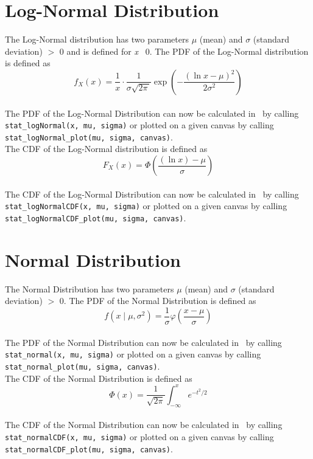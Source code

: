 	\section{Log-Normal Distribution}
	
		The Log-Normal distribution has two parameters $\mu$ (mean) and $\sigma$ (standard deviation) $>$ 0 and is defined for \textit{x} \geq\ 0. The \ac{PDF} of the Log-Normal distribution is defined as
		\\[0.3cm]
		$$f_X(x) = \frac 1 x \cdot \frac 1 {\sigma\sqrt{2\pi\,}} \exp\left( -\frac{(\ln x-\mu)^2}{2\sigma^2} \right)$$
		\\[0.3cm]
		The \ac{PDF} of the Log-Normal Distribution can now be calculated in \setlx\ by calling \lstinline{stat_logNormal(x, mu, sigma)} or plotted on a given canvas by calling \lstinline{stat_logNormal_plot(mu, sigma, canvas)}.
		\\[0.3cm]
		The \ac{CDF} of the Log-Normal distribution is defined as
		\\[0.3cm]
		$$F_X(x) = \Phi\left( \frac{(\ln x) - \mu} \sigma \right)$$
		\\[0.3cm]
		The \ac{CDF} of the Log-Normal Distribution can now be calculated in \setlx\ by calling \lstinline{stat_logNormalCDF(x, mu, sigma)} or plotted on a given canvas by calling \lstinline{stat_logNormalCDF_plot(mu, sigma, canvas)}.

	\section{Normal Distribution}
	
		The Normal Distribution has two parameters $\mu$ (mean) and $\sigma$ (standard deviation) $>$ 0. The \ac{PDF} of the Normal Distribution is defined as
		\\[0.3cm]
		$$f(x \mid \mu, \sigma^2) =\frac 1 \sigma \varphi\left(\frac{x-\mu} \sigma \right)$$
		\\[0.3cm]
		The \ac{PDF} of the Normal Distribution can now be calculated in \setlx\ by calling \lstinline{stat_normal(x, mu, sigma)} or plotted on a given canvas by calling \lstinline{stat_normal_plot(mu, sigma, canvas)}.
		\\[0.3cm]
		The \ac{CDF} of the Normal Distribution is defined as
		\\[0.3cm]
		$$\Phi(x) = \frac 1 {\sqrt{2\pi}} \int_{-\infty}^x e^{-t^2/2}$$
		\\[0.3cm]
		The \ac{CDF} of the Normal Distribution can now be calculated in \setlx\ by calling \lstinline{stat_normalCDF(x, mu, sigma)} or plotted on a given canvas by calling \lstinline{stat_normalCDF_plot(mu, sigma, canvas)}.
		
